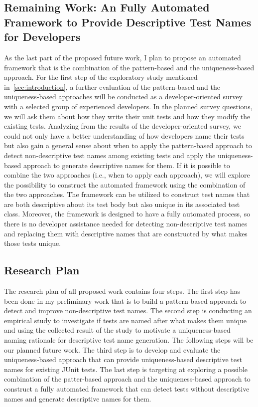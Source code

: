 \subsection{Remaining Work: An Fully Automated Framework to Provide Descriptive Test Names for Developers}
\label{sec:remaining-work2}

As the last part of the proposed future work, I plan to propose an automated framework that is the combination of the pattern-based and the uniqueness-based approach.
%
For the first step of the exploratory study mentioned in~\cref{sec:introduction}, a further evaluation of the pattern-based and the uniqueness-based approaches will be conducted as a developer-oriented survey with a selected group of experienced developers.
%
In the planned survey questions, we will ask them about how they write their unit tests and how they modify the existing tests.
%
Analyzing from the results of the developer-oriented survey, we could not only have a better understanding of how developers name their tests but also gain a general sense about when to apply the pattern-based approach to detect non-descriptive test names among existing tests and apply the uniqueness-based approach to generate descriptive names for them.
%
If it is possible to combine the two approaches (i.e., when to apply each approach), we will explore the possibility to construct the automated framework using the combination of the two approaches.
%
The framework can be utilized to construct test names that are both descriptive about its test body but also unique in its associated test class.
%
Moreover, the framework is designed to have a fully automated process, so there is no developer assistance needed for detecting non-descriptive test names and replacing them with descriptive names that are constructed by what makes those tests unique.


\subsection{Research Plan}

The research plan of all proposed work contains four steps.
%
The first step has been done in my preliminary work that is to build a pattern-based approach to detect and improve non-descriptive test names.
%
The second step is conducting an empirical study to investigate if tests are named after what makes them unique and using the collected result of the study to motivate a uniqueness-based naming rationale for descriptive test name generation.
%
The following steps will be our planned future work.
%
The third step is to develop and evaluate the uniqueness-based approach that can provide uniqueness-based descriptive test names for existing JUnit tests.
%
The last step is targeting at exploring a possible combination of the patter-based approach and the uniqueness-based approach to construct a fully automated framework that can detect tests without descriptive names and generate descriptive names for them.